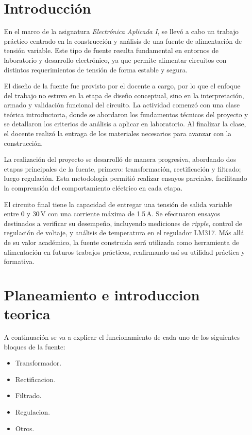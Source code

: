 \documentclass[chaptersright]{informeutn}
\begin{document}
  \maketitle

  \tableofcontents
  \setcounter{page}{1}
  \thispagestyle{plain}

  \chapter{Introducción} 

    En el marco de la asignatura \textit{Electrónica Aplicada I}, se llevó a cabo un trabajo práctico centrado en la
    construcción y análisis de una fuente de alimentación de tensión variable. Este tipo de fuente resulta fundamental
    en entornos de laboratorio y desarrollo electrónico, ya que permite alimentar circuitos con distintos
    requerimientos de tensión de forma estable y segura.

    El diseño de la fuente fue provisto por el docente a cargo, por lo que el enfoque del trabajo no estuvo en la etapa
    de diseño conceptual, sino en la interpretación, armado y validación funcional del circuito. La actividad comenzó
    con una clase teórica introductoria, donde se abordaron los fundamentos técnicos del proyecto y se detallaron los
    criterios de análisis a aplicar en laboratorio. Al finalizar la clase, el docente realizó la entraga de los 
    materiales necesarios para avanzar con la construcción.

    La realización del proyecto se desarrolló de manera progresiva, abordando dos etapas principales de la
    fuente, primero: transformación, rectificación y filtrado; luego regulación. Esta metodología permitió realizar 
    ensayos parciales, facilitando la comprensión del comportamiento eléctrico en cada etapa.

    El circuito final tiene la capacidad de entregar una tensión de salida variable entre 0 y 30\,V con una corriente
    máxima de 1.5\,A. Se efectuaron ensayos destinados a verificar su desempeño, incluyendo mediciones de
    \textit{ripple}, control de regulación de voltaje, y análisis de temperatura en el regulador LM317. Más allá de su
    valor académico, la fuente construida será utilizada como herramienta de alimentación en futuros trabajos
    prácticos, reafirmando así su utilidad práctica y formativa.

  \chapter{Planeamiento e introduccion teorica}
    A continuación se va a explicar el funcionamiento de cada uno de los siguientes bloques de la fuente:
    \begin{itemize}
      \item Transformador.
      \item Rectificacion.
      \item Filtrado.
      \item Regulacion.
      \item Otros.
    \end{itemize}
        
\end{document}
